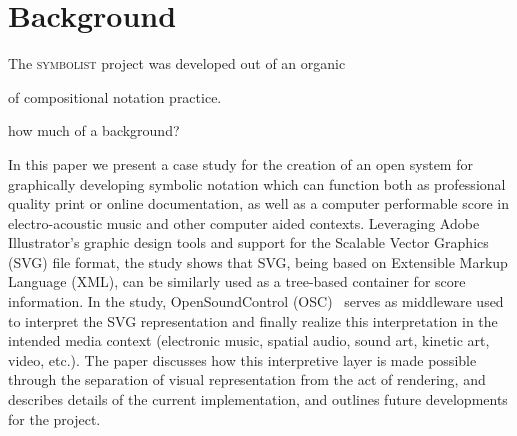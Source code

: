 \documentclass{article}
\title{\papertitle}
\def\symbolist{\textsc{symbolist}\xspace}
\begin{document}
%
\capstartfalse
\maketitle
\capstarttrue


\begin{abstract}

maybe already start with history here, and then continue to symbolist?

  \symbolist is an in-development application for experimental notation, with the goal of creating a working environment for developing symbolic notation for multimedia which can be interpreted and performed by electronics. The program aims to provide an open play space, with tools for experimentation, and thinking visually about relationships between representation and interpretation in media performance. 
In the paper we discuss the evaluation and re-design of the application based on the need for a bi-directional mapping framework for working with symbolic notation and its corresponding data representations.

\end{abstract}



\section{Background}\label{sec:background}


The \symbolist project was developed out of an organic  

of compositional notation practice. 

how much of a background?


In this paper we present a case study for the creation of an open system for graphically developing symbolic notation which can function both as professional quality print or online documentation, as well as a computer performable score in electro-acoustic music and other computer aided contexts. Leveraging Adobe Illustrator’s graphic design tools and support for the Scalable Vector Graphics (SVG) file format, the study shows that SVG, being based on Extensible Markup Language (XML), can be similarly used as a tree-based container for score information. In the study, OpenSoundControl (OSC)~\cite{wright:osc}  serves as middleware used to interpret the SVG representation and finally realize this interpretation in the intended media context (electronic music, spatial audio, sound art, kinetic art, video, etc.). The paper discusses how this interpretive layer is made possible through the separation of visual representation from the act of rendering, and describes details of the current implementation, and outlines future developments for the project.
\end{document}
